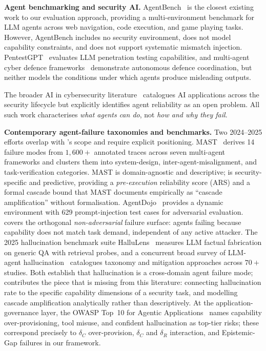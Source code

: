 \textbf{Agent benchmarking and security AI.}
AgentBench~\cite{liu2023agentbench} is the closest existing work to our
evaluation approach, providing a multi-environment benchmark for LLM agents
across web navigation, code execution, and game playing tasks. However,
AgentBench includes no security environment, does not model capability
constraints, and does not support systematic mismatch injection.
PentestGPT~\cite{deng2023pentest} evaluates LLM penetration testing
capabilities, and multi-agent cyber defence frameworks~\cite{xu2024}
demonstrate autonomous defence coordination, but neither models the
conditions under which agents produce misleading outputs.

The broader AI in cybersecurity literature~\cite{apruzzese2023} catalogues
AI applications across the security lifecycle but explicitly identifies
agent reliability as an open problem. All such work characterises
\textit{what agents can do}, not \textit{how and why they fail}.

\textbf{Contemporary agent-failure taxonomies and benchmarks.}
Two 2024--2025 efforts overlap with \ARES{}'s scope and require
explicit positioning. MAST~\cite{cemri2025mast} derives 14
failure modes from $1{,}600{+}$ annotated traces across seven
multi-agent frameworks and clusters them into system-design,
inter-agent-misalignment, and task-verification categories.
MAST is domain-agnostic and descriptive; \ARES{} is security-specific
and predictive, providing a \textit{pre-execution} reliability
score (ARS) and a formal cascade bound that MAST documents
empirically as ``cascade amplification'' without formalisation.
AgentDojo~\cite{debenedetti2024agentdojo} provides a dynamic
environment with 629 prompt-injection test cases for adversarial
evaluation. \ARES{} covers the orthogonal \textit{non-adversarial}
failure surface: agents failing because capability does not match
task demand, independent of any active attacker. The 2025
hallucination benchmark suite HalluLens~\cite{bang2025hallulens}
measures LLM factual fabrication on generic QA with retrieval
probes, and a concurrent broad survey of LLM-agent
hallucination~\cite{llmagent_halluc_survey2025} catalogues
taxonomy and mitigation approaches across $70{+}$ studies. Both
establish that hallucination is a cross-domain agent failure
mode; \ARES{} contributes the piece that is missing from
this literature: connecting hallucination rate to the specific
capability dimensions of a security task, and modelling cascade
amplification analytically rather than descriptively. At the
application-governance layer, the OWASP Top~10 for Agentic
Applications~\cite{owasp2026agentic} names capability
over-provisioning, tool misuse, and confident hallucination as
top-tier risks; these correspond precisely to $\delta_C$
over-provision, $\delta_C$ and $\delta_R$ interaction, and
Epistemic-Gap failures in our framework.

